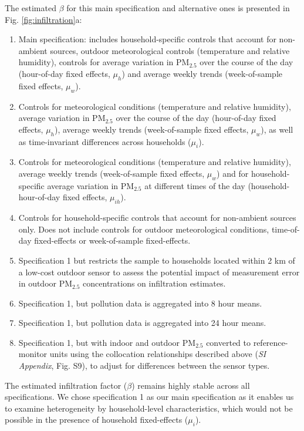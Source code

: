 \documentclass[9pt,twocolumn,twoside]{pnas-new}
\begin{document}
The estimated $\beta$ for this main specification and alternative ones is presented in Fig. \ref{fig:infiltration}a: 
\begin{enumerate}
    \item Main specification: includes household-specific controls that account for non-ambient sources, outdoor meteorological controls (temperature and relative humidity), controls for average variation in PM$_{2.5}$ over the course of the day (hour-of-day fixed effects, $\mu_h$) and average weekly trends (week-of-sample fixed effects, $\mu_w$).
    \item Controls for meteorological conditions (temperature and relative humidity), average variation in PM$_{2.5}$ over the course of the day (hour-of-day fixed effects, $\mu_h$),  average weekly trends (week-of-sample fixed effects, $\mu_w$), as well as time-invariant differences across households ($\mu_i$).
    \item Controls for meteorological conditions (temperature and relative humidity), average weekly trends (week-of-sample fixed effects, $\mu_w$) and for household-specific average variation in PM$_{2.5}$ at different times of the day (household-hour-of-day fixed effects, $\mu_{ih}$).
    \item Controls for household-specific controls that account for non-ambient sources only. Does not include controls for outdoor meteorological conditions, time-of-day fixed-effects or week-of-sample fixed-effects.
    \item Specification 1 but restricts the sample to households located within 2 km of a low-cost outdoor sensor to assess the potential impact of measurement error in outdoor PM$_{2.5}$ concentrations on infiltration estimates.
    \item Specification 1, but pollution data is aggregated into 8 hour means. 
    \item Specification 1, but pollution data is aggregated into 24 hour means.
    \item Specification 1, but with indoor and outdoor PM$_{2.5}$ converted to reference-monitor units using the collocation relationships described above (\textit{SI Appendix}, Fig. S9), to adjust for differences between the sensor types.
\end{enumerate}

The estimated infiltration factor ($\beta$) remains highly stable across all specifications. We chose specification 1 as our main specification as it enables us to examine heterogeneity by household-level characteristics, which would not be possible in the presence of household fixed-effects ($\mu_i$). 
\\ 
\end{document}
